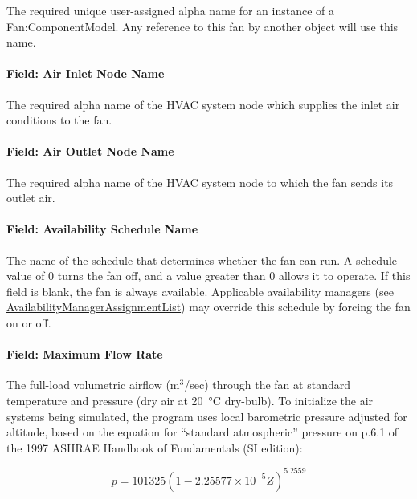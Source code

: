 The required unique user-assigned alpha name for an instance of a Fan:ComponentModel. Any reference to this fan by another object will use this name.

\paragraph{Field: Air Inlet Node Name}\label{field-air-inlet-node-name-4-000}

The required alpha name of the HVAC system node which supplies the inlet air conditions to the fan.

\paragraph{Field: Air Outlet Node Name}\label{field-air-outlet-node-name-4-000}

The required alpha name of the HVAC system node to which the fan sends its outlet air.

\paragraph{Field: Availability Schedule Name}\label{field-availability-schedule-name-4-002}

The name of the schedule that determines whether the fan can run. A schedule value of 0 turns the fan off, and a value greater than 0 allows it to operate. If this field is blank, the fan is always available. Applicable availability managers (see \hyperref[availabilitymanagerassignmentlist]{AvailabilityManagerAssignmentList}) may override this schedule by forcing the fan on or off.

\paragraph{Field: Maximum Flow Rate}\label{field-maximum-flow-rate-5}

The full-load volumetric airflow (m\(^{3}\)/sec) through the fan at standard temperature and pressure (dry air at \SI{20}{\celsius} dry-bulb). To initialize the air systems being simulated, the program uses local barometric pressure adjusted for altitude, based on the equation for ``standard atmospheric'' pressure on p.6.1 of the 1997 ASHRAE Handbook of Fundamentals (SI edition):

\begin{equation}
p = 101325 \left(1 - 2.25577 \times 10^{-5} Z\right)^{5.2559}
\end{equation}

